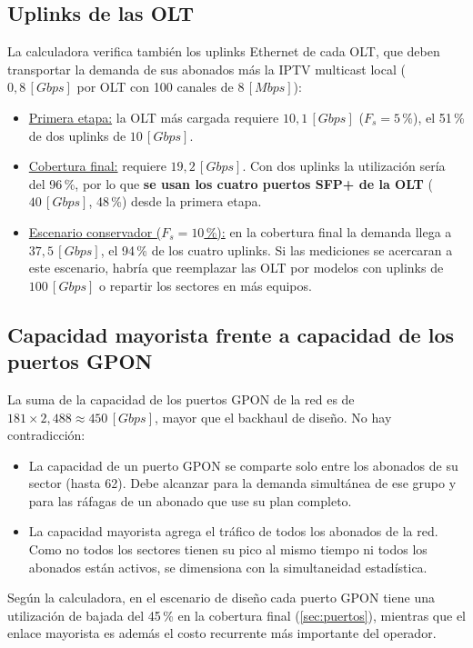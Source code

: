 \subsection{Uplinks de las OLT}
\label{sec:uplinks}
La calculadora verifica también los uplinks Ethernet de cada OLT, que deben transportar la demanda de sus abonados más la IPTV multicast local ($0{,}8 \, [Gbps]$ por OLT con 100 canales de $8 \, [Mbps]$):
\begin{itemize}
    \item \underline{Primera etapa:} la OLT más cargada requiere $10{,}1 \, [Gbps]$ ($F_s = 5$\,\%), el 51\,\% de dos uplinks de $10 \, [Gbps]$.
    \item \underline{Cobertura final:} requiere $19{,}2 \, [Gbps]$. Con dos uplinks la utilización sería del 96\,\%, por lo que \textbf{se usan los cuatro puertos SFP+ de la OLT} ($40 \, [Gbps]$, 48\,\%) desde la primera etapa.
    \item \underline{Escenario conservador ($F_s = 10$\,\%):} en la cobertura final la demanda llega a $37{,}5 \, [Gbps]$, el 94\,\% de los cuatro uplinks. Si las mediciones se acercaran a este escenario, habría que reemplazar las OLT por modelos con uplinks de $100 \, [Gbps]$ o repartir los sectores en más equipos.
\end{itemize}

\subsection{Capacidad mayorista frente a capacidad de los puertos GPON}
La suma de la capacidad de los puertos GPON de la red es de $181 \times 2{,}488 \approx 450 \, [Gbps]$, mayor que el backhaul de diseño. No hay contradicción:
\begin{itemize}
    \item La capacidad de un puerto GPON se comparte solo entre los abonados de su sector (hasta 62). Debe alcanzar para la demanda simultánea de ese grupo y para las ráfagas de un abonado que use su plan completo.
    \item La capacidad mayorista agrega el tráfico de todos los abonados de la red. Como no todos los sectores tienen su pico al mismo tiempo ni todos los abonados están activos, se dimensiona con la simultaneidad estadística.
\end{itemize}
Según la calculadora, en el escenario de diseño cada puerto GPON tiene una utilización de bajada del 45\,\% en la cobertura final (\autoref{sec:puertos}), mientras que el enlace mayorista es además el costo recurrente más importante del operador.

